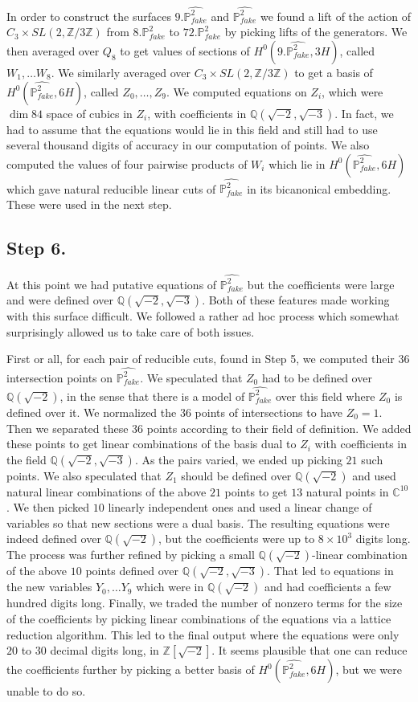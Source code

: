 \documentclass[11pt,reqno]{amsart}
\def\C {{\mathbb C}}
\def\Q {{\mathbb Q}}
\def\Z {{\mathbb Z}}
\def\P {{\mathbb P}}
\def\FPP {{\P^2_{fake}}}
\theoremstyle{definition}
\numberwithin{equation}{section}
\begin{document}
\medskip
In order to construct the surfaces $9.\widehat\FPP$ and $\widehat\FPP$ we found a lift of the action of $C_3\times SL(2,\Z/3\Z)$ from $8.\FPP$ to $72.\FPP$ by picking lifts of the generators. We then averaged over $Q_8$ to get values of sections of $H^0(9.\widehat\FPP,3H)$, called $W_1,\ldots W_8$. We similarly averaged over $C_3\times SL(2,\Z/3\Z)$ to get a basis of  $H^0(\widehat\FPP,6H)$, called $Z_0,\ldots, Z_9$. We computed equations on $Z_i$, which were $\dim 84$ space of cubics in $Z_i$, with coefficients in $\Q(\sqrt{-2},\sqrt{-3})$. In fact, we had to assume that the equations would lie in this field and still had to use several thousand digits of accuracy in our computation of points. We also computed the values of  four pairwise products of $W_i$ which lie in $H^0(\widehat\FPP,6H)$ which gave natural reducible linear cuts of $\widehat \FPP$ in its bicanonical embedding. These were used in the next step.

\subsection{Step 6.} At this point we had putative equations of $\widehat\FPP$ but the coefficients were large and were defined over $\Q(\sqrt{-2},\sqrt{-3})$. Both of these features made working with this surface difficult. We followed a rather ad hoc process which somewhat surprisingly allowed us to take care of both issues.

\medskip
First or all, for each pair of reducible cuts, found in Step 5, we computed their $36$ intersection points on $\widehat\FPP$. We speculated that $Z_0$ had to be defined over $\Q(\sqrt{-2})$, in the sense that there is a model of $\widehat\FPP$ over this field where $Z_0$ is defined over it. We normalized the $36$ points of intersections to have $Z_0=1$. Then we separated these $36$ points according to their field of definition. We added these points to get linear combinations of the basis dual to $Z_i$ with coefficients in the field $\Q(\sqrt{-2},\sqrt{-3})$. As the pairs varied, we ended up picking $21$ such points.
We also speculated that $Z_1$ should be defined over  $\Q(\sqrt{-2})$ and used natural linear combinations of the above $21$ points to get $13$ natural points in $\C^{10}$.
We then picked $10$ linearly independent ones and used a linear change of variables so that new sections were a dual basis. The resulting equations were indeed defined over  $\Q(\sqrt{-2})$, but the coefficients were up to $8\times 10^3$ digits long. The process was further refined by picking a small $\Q(\sqrt{-2})$-linear combination of the above $10$ points defined over $\Q(\sqrt{-2},\sqrt{-3})$. That led to equations in the new variables $Y_0,\ldots Y_9$ which were in $\Q(\sqrt{-2})$ and had coefficients a few hundred digits long. Finally, we traded the number of nonzero terms for the size of the coefficients by picking linear combinations of the equations via a lattice reduction algorithm. This led to the final output where the equations were only $20$ to $30$ decimal digits long, in $\Z[\sqrt{-2}]$. It seems plausible that one can reduce the coefficients further by picking a better basis of $H^0(\widehat\FPP,6H)$, but we were unable to do so.
\end{document}
